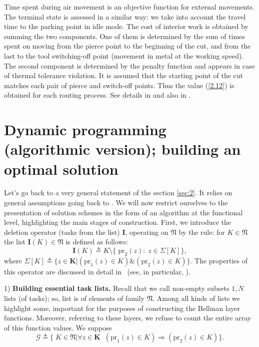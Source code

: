 \documentclass[numbers,sort&compress]{IntechOpen-Book}%
\begin{document}
Time spent during air movement
is an
objective function for external movements.
The terminal state is assessed in a similar way:
we take into account the travel time to the parking point
in idle mode.
The cost of interior work
is obtained by summing the two components.
One of them is determined by the sum of times
spent on moving
from the pierce point  to the beginning of the cut,
and from the last to the tool switching-off point
(movement in metal at the working speed).
The second component is determined by the penalty function and
appears in case of thermal tolerance violation.
It is assumed that the starting point of the cut
matches each pair
of pierce and switch-off points.
Thus
the value  (\ref{2.12})
is obtained
for each routing process.
See details in
\cite[part 1, chapter 3]{4}
and also in
\cite{18}.

\section{%
Dynamic programming
(algorithmic version);
building an optimal solution%
}
\label{sec:4}

Let's go back to a very general statement of the section
\ref{sec:2}.
It relies on general assumptions going back to
\cite[$\S$4.9]{14}.
We will now restrict ourselves to the presentation of
solution schemes
in the form of an algorithm at the functional level,
highlighting the main stages of construction.
First,
we introduce the deletion operator
(tasks from the list)
$\mathbf{I}$,
operating on $\mathfrak{N}$
by the rule:
for
$K \in \mathfrak{N}$
the list
$\mathbf{I}(K) \in \mathfrak{N}$
is defined as follows:
\begin{equation}\label{4.1}
  \mathbf{I}(K) {\triangleq} K \setminus \{\;\mathrm{pr}_2(z):\;z \in \Sigma[K]\},
\end{equation}
where
$\Sigma[K] {\triangleq} \{z \in \mathbf{K} \vert (\mathrm{pr}_1(z) \in K) \& (\mathrm{pr}_2(z) \in K)\}.$
The properties of this operator are discussed in detail in~\cite[part 2]{14}
(see, in particular, \cite[$\S 2.2$]{14}).

1) {\bf Building essential task lists.}
Recall
that we call
non-empty subsets
$ \overline {1, N} $
lists
(of tasks);
so,
list is of elements of family
$\mathfrak{N}$.
Among all kinds of lists
we highlight some,
important for the purposes of constructing the Bellman layer functions.
Moreover,
referring to these layers,
we refuse to count the entire array of
this function values.
We suppose
\begin{equation}\label{4.2}
  \mathcal{G} {\triangleq} \{\;K \in \mathfrak{N} \vert
  \forall{z} \in \mathbf{K}\;\;(\mathrm{pr}_1(z) \in K) \Longrightarrow (\mathrm{pr}_2(z) \in K)\}.
\end{equation}
\end{document}
